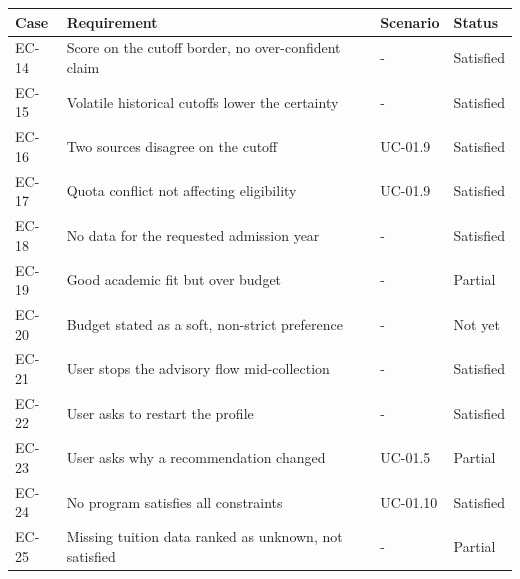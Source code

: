 \documentclass[../main.tex]{subfiles}
\begin{document}
\noindent\begin{tabular}{@{}p{1.3cm}p{6.0cm}p{2.2cm}p{2.0cm}@{}}
\hline
\textbf{Case} & \textbf{Requirement} & \textbf{Scenario} & \textbf{Status} \\
\hline
EC-14 & Score on the cutoff border, no over-confident claim & - & Satisfied \\
EC-15 & Volatile historical cutoffs lower the certainty & - & Satisfied \\
EC-16 & Two sources disagree on the cutoff & UC-01.9 & Satisfied \\
EC-17 & Quota conflict not affecting eligibility & UC-01.9 & Satisfied \\
EC-18 & No data for the requested admission year & - & Satisfied \\
EC-19 & Good academic fit but over budget & - & Partial \\
EC-20 & Budget stated as a soft, non-strict preference & - & Not yet \\
EC-21 & User stops the advisory flow mid-collection & - & Satisfied \\
EC-22 & User asks to restart the profile & - & Satisfied \\
EC-23 & User asks why a recommendation changed & UC-01.5 & Partial \\
EC-24 & No program satisfies all constraints & UC-01.10 & Satisfied \\
EC-25 & Missing tuition data ranked as unknown, not satisfied & - & Partial \\
\hline
\end{tabular}
\end{document}
